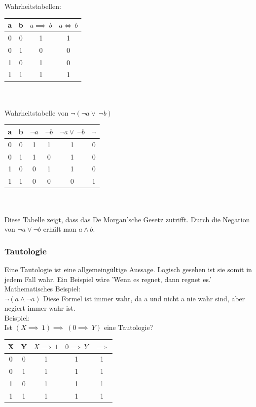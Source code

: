 \documentclass{article}
\begin{document}
	Wahrheitstabellen: \\
	\begin{tabular}{| c | c | c | c |}
		\toprule
		a & b & $a \implies\ b$ & $a \iff\ b$ \\ \midrule
		0 & 0 & 1 & 1 \\ \hline
		0 & 1 & 0 & 0 \\ \hline
		1 & 0 & 1 & 0 \\ \hline
		1 & 1 & 1 & 1 \\
		\bottomrule
	\end{tabular} \\ \\
	Wahrheitstabelle von $\neg (\neg a \lor\ \neg b)$ \\
	\begin{tabular}{| c | c | c | c | c | c |}
		\toprule
		a & b & $\neg a$ & $\neg b$ & $\neg a \lor\ \neg b$ & $\neg $\\ \midrule
		0 & 0 & 1 & 1 & 1 & 0 \\ \hline
		0 & 1 & 1 & 0 & 1 & 0 \\ \hline
		1 & 0 & 0 & 1 & 1 & 0 \\ \hline
		1 & 1 & 0 & 0 & 0 & 1 \\
		\bottomrule
	\end{tabular} \\ \\
	Diese Tabelle zeigt, dass das De Morgan'sche Gesetz zutrifft. Durch die Negation von $\neg a\lor\neg b$ erhält man $a\land b$.
	\subsubsection{Tautologie}
	Eine Tautologie ist eine allgemeingültige Aussage. Logisch gesehen ist sie somit in jedem Fall wahr. Ein Beispiel wäre 'Wenn es regnet, dann regnet es.' \\
	Mathematisches Beispiel: \\
	$\neg (a \land \neg a)$ Diese Formel ist immer wahr, da a und nicht a nie wahr sind, aber negiert immer wahr ist. \\
	Beispiel: \\
	Ist $ (X \implies\ 1) \implies\ (0 \implies\ Y)$ eine Tautologie? \\
	\begin{tabular}{| c | c | c | c | c |}
		\toprule
		X & Y & $X \implies\ 1$ &$ 0 \implies\ Y$ & $\implies$ \\ \midrule
		0 & 0 & 1 & 1 & 1 \\ \hline
		0 & 1 & 1 & 1 & 1 \\ \hline
		1 & 0 & 1 & 1 & 1 \\ \hline
		1 & 1 & 1 & 1 & 1 \\
		\bottomrule
	\end{tabular}
\end{document}

